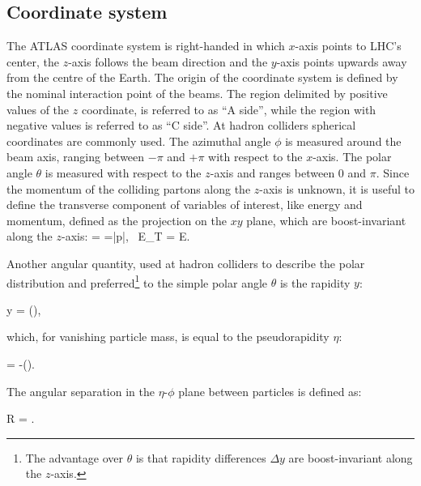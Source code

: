 \subsection{Coordinate system}
The ATLAS coordinate system is right-handed in which $x$-axis points to LHC's center, the $z$-axis follows the beam direction and the $y$-axis points upwards away from the centre of the Earth. The origin of the coordinate system is defined by the nominal interaction point of the beams. The region delimited by positive values of the $z$ coordinate, is referred to as ``A side'', while the region with negative values is referred to as ``C side''. At hadron colliders spherical coordinates are commonly used. The azimuthal angle $\phi$ is measured around the beam axis, ranging between $-\pi$ and $+\pi$ with respect to the $x$-axis. The polar angle $\theta$ is measured with respect to the $z$-axis and ranges between 0 and $\pi$. Since the momentum of the colliding partons along the $z$-axis is unknown, it is useful to define the transverse component of variables of interest, like energy and momentum, defined as the projection on the $xy$ plane, which are boost-invariant along the $z$-axis:
\be
\pt = =|\vec p|\sin\theta, \,  E_{T} = E\sin\theta.
\label{sec:det:eq:ptdefinition}
\ee

\noindent Another angular quantity, used at hadron colliders to describe the polar distribution and preferred\footnote{The advantage over $\theta$ is that rapidity differences $\Delta y$ are boost-invariant along the $z$-axis.} to the simple polar angle $\theta$ is the rapidity $y$:

\be
y = \ln\left(\right),
\label{sec:det:eq:rapidity}
\ee

\noindent which, for vanishing particle mass, is equal to the pseudorapidity $\eta$:

\be
\eta = -\ln\left(\tan{}\right).
\label{sec:det:eq:pseudorapidity}
\ee

\noindent The angular separation in the $\eta$-$\phi$ plane between particles is defined as:

\be
\Delta R = .
\label{sec:det:eq:deltaRdefinition}
\ee



